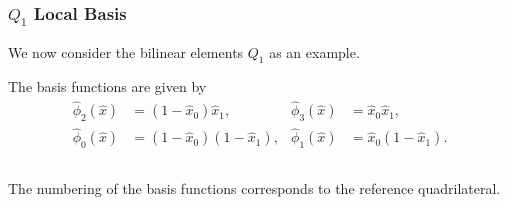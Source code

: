 \begin{frame}
\frametitle<presentation>{$Q_1$ Local Basis}
We now consider the bilinear elements $Q_1$ as an example.

The basis functions are given by
\begin{align*}
\hat\phi_2(\hat{x}) &= (1-\hat{x}_0)\hat{x}_1, &
\hat\phi_3(\hat{x}) &= \hat{x}_0\hat{x}_1, \\
\hat\phi_0(\hat{x}) &= (1-\hat{x}_0)(1-\hat{x}_1), &
\hat\phi_1(\hat{x}) &= \hat{x}_0(1-\hat{x}_1).
\end{align*}


\begin{columns}
\begin{column}{0.65\textwidth}
The numbering of the basis functions corresponds to the reference
quadrilateral.
\end{column}
\end{columns}


\end{frame}
